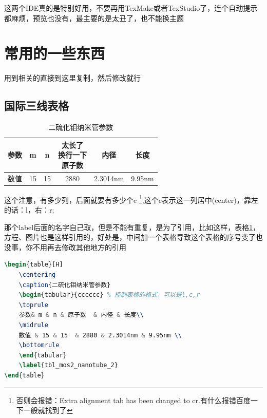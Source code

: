 \documentclass[AutoFakeBold]{LZUThesis2007}
\begin{document}
这两个IDE真的是特别好用，不要再用TexMake或者TexStudio了，连个自动提示都麻烦，预览也没有，最主要的是太丑了，也不能换主题



\section{常用的一些东西} %
\label{sec:常用的一些东西}

用到相关的直接到这里复制，然后修改就行

\subsection{国际三线表格} %
\label{sub:国际三线表格}

\begin{table}[H]
    \centering
    \caption{二硫化钼纳米管参数}
    \begin{tabular}{cccccc} %
    \toprule
    参数& m & n & \tabincell{c}{太长了\\换行一下\\原子数}  & 内径 & 长度\\
    \midrule
    数值 & 15 & 15  & 2880 & 2.3014nm & 9.95nm \\
    \bottomrule
    \end{tabular}
    \label{tbl_mos2_nanotube}
\end{table}

这个注意，有多少列，后面就要有多少个c \footnote{否则会报错：Extra alignment tab has been changed to cr.有什么报错百度一下一般就找到了},这个c表示这一列居中(center)，靠左的话：l，右：r;

那个label后面的名字自己取，但是不能有重复，是为了引用，比如这样，表格\ref{tbl_mos2_nanotube}，方程、图片也是这样引用的，好处是，中间加一个表格导致这个表格的序号变了也没事，你不用再去修改其他地方的引用

\begin{lstlisting}[language = tex]
\begin{table}[H]
    \centering
    \caption{二硫化钼纳米管参数}
    \begin{tabular}{cccccc} % 控制表格的格式，可以是l,c,r
    \toprule
    参数& m & n & 原子数  & 内径 & 长度\\
    \midrule
    数值 & 15 & 15  & 2880 & 2.3014nm & 9.95nm \\
    \bottomrule
    \end{tabular}
    \label{tbl_mos2_nanotube_2}
\end{table}
\end{lstlisting}
\end{document}
